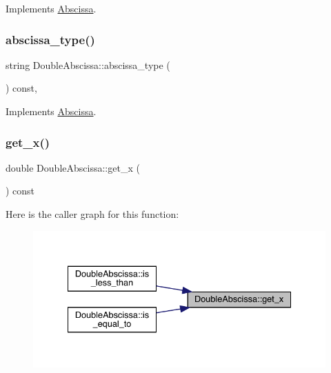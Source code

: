 Implements \mbox{\hyperlink{classAbscissa_af57ffcd07eee633bb2313bc7a932f3bb}{Abscissa}}.

\mbox{\label{classDoubleAbscissa_ae69cb78334800cb8477daf2cefb4d67e}} 
\subsubsection{\texorpdfstring{abscissa\_type()}{abscissa\_type()}\hspace{0.1cm}{\footnotesize\ttfamily [2/2]}}
{\footnotesize\ttfamily string Double\+Abscissa\+::abscissa\+\_\+type (\begin{DoxyParamCaption}{ }\end{DoxyParamCaption}) const\hspace{0.3cm}{\ttfamily [inline]}, {\ttfamily [virtual]}}



Implements \mbox{\hyperlink{classAbscissa_af57ffcd07eee633bb2313bc7a932f3bb}{Abscissa}}.

\mbox{\label{classDoubleAbscissa_a9ed0def501b85ac1b9062d5a0dee9895}} 
\subsubsection{\texorpdfstring{get\_x()}{get\_x()}\hspace{0.1cm}{\footnotesize\ttfamily [1/2]}}
{\footnotesize\ttfamily double Double\+Abscissa\+::get\+\_\+x (\begin{DoxyParamCaption}{ }\end{DoxyParamCaption}) const\hspace{0.3cm}{\ttfamily [inline]}}

Here is the caller graph for this function\+:
\nopagebreak
\begin{figure}[H]
\begin{center}
\leavevmode
\includegraphics[width=334pt]{d4/ded/classDoubleAbscissa_a9ed0def501b85ac1b9062d5a0dee9895_icgraph}
\end{center}
\end{figure}
\mbox{\label{classDoubleAbscissa_a9ed0def501b85ac1b9062d5a0dee9895}} 
